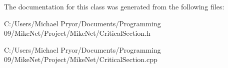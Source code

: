 


The documentation for this class was generated from the following files:\begin{DoxyCompactItemize}
\item 
C:/Users/Michael Pryor/Documents/Programming 09/MikeNet/Project/MikeNet/CriticalSection.h\item 
C:/Users/Michael Pryor/Documents/Programming 09/MikeNet/Project/MikeNet/CriticalSection.cpp\end{DoxyCompactItemize}
